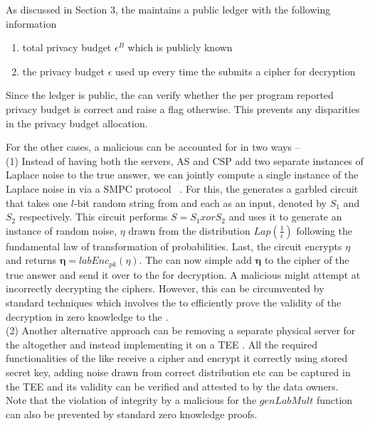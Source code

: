 As discussed in Section 3, the \CSP maintains a public ledger with the following information
\begin{enumerate}\item  total privacy budget $\epsilon^B$ which is publicly known
\item the privacy budget $\epsilon$ used up every time the \AS submits a cipher for decryption
\end{enumerate}
Since the ledger is public, the \AS can verify whether the per program reported privacy budget is correct and raise a flag otherwise. This prevents any disparities in the privacy budget allocation.

For the other cases, a malicious \CSP can be accounted for in two ways --\\
(1)  Instead of having  both the servers, \textsf{AS} and \textsf{CSP} add two separate instances of Laplace noise to the true answer, we can jointly compute a single instance of the Laplace noise in \system via a SMPC protocol ~\cite{Djoin,DworkOurData}. For this, the \CPS generates a garbled circuit that takes one $l$-bit random string from \CPS and \AS each as an input, denoted by $S_1$ and $S_2$ respectively. This circuit performs $S=S_1 xor S_2$  and uses it to generate an instance of random noise, $\eta$ drawn from the distribution $Lap(\frac{1}{\epsilon})$ following the fundamental law of transformation of probabilities.
Last, the circuit encrypts $\eta$ and returns $\boldsymbol{\eta}=labEnc_{pk}(\eta)$. 
The \AS can now simple add $\boldsymbol{\eta}$ to the cipher of the true answer and send it over to the \CSP for decryption. A malicious \CSP might attempt at incorrectly decrypting the ciphers. However, this can be circumvented by standard techniques which involves the \CSP to efficiently prove the validity of the decryption in zero knowledge to the \AS.\\
(2)  Another alternative approach can be removing a separate physical server for the \CSP altogether and instead implementing it on a TEE \cite{Boneh2,Prochlo,Aïmeur2008}. All the required functionalities of the \CSP like receive a cipher and encrypt it correctly using stored secret key, adding noise drawn from correct distribution etc can be captured in the TEE and its validity can be verified and attested to by the data owners.
\\Note that the violation of integrity by a malicious \CSP for the $genLabMult$ function can also be prevented by standard zero knowledge proofs.
